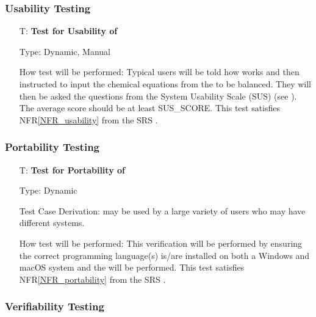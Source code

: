 \documentclass[12pt, titlepage]{article}
\newcounter{testnum} %
\newcommand{\nfrref}[1]{NFR\ref{#1}}
\begin{document}
\subsubsection{Usability Testing}

\begin{enumerate}

  \item[T\refstepcounter{testnum}\thetestnum \label{test_usable}:]
    \textbf{Test for Usability of \progname{}}

    Type: Dynamic, Manual

    How test will be performed: Typical users will be told how \progname{}
    works and then instructed to input the chemical equations from the
     to be balanced. They will then be asked the
    questions from the System Usability Scale (SUS) \cite{thomas_how_2015}
    (see ). The average score should be at least
    SUS\_SCORE. This test satisfies \nfrref{NFR_usability} from
    the SRS \cite{srs}.

\end{enumerate}

\subsubsection{Portability Testing}

\begin{enumerate}

  \item[T\refstepcounter{testnum}\thetestnum \label{test_portable}:]
    \textbf{Test for Portability of \progname{}}

    Type: Dynamic

    Test Case Derivation: \progname{} may be used by a large variety of users
    who may have different systems.

    How test will be performed: This verification will be performed by
    ensuring the correct programming language(s) is/are installed on both a
    Windows and macOS system and the  will be
    performed. This test satisfies \nfrref{NFR_portability} from the SRS
    \cite{srs}.

\end{enumerate}

\subsubsection{Verifiability Testing}
\end{document}

